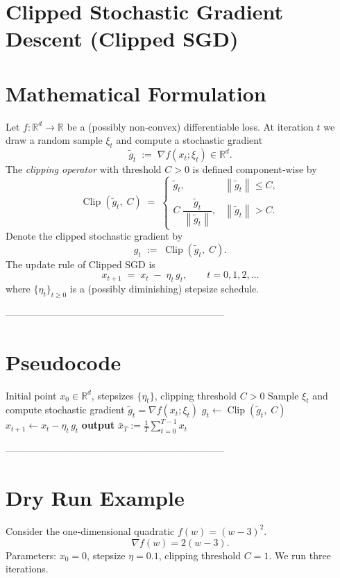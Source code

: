 \documentclass{article}
\newcommand{\clip}[2]{\operatorname{Clip}\!\left(#1,\;#2\right)}
\newcommand{\norm}[1]{\left\|#1\right\|}
\newcommand{\R}{\mathbb{R}}
\begin{document}
\section*{Clipped Stochastic Gradient Descent (Clipped SGD)}

\section*{Mathematical Formulation}
Let $f:\R^{d}\rightarrow\R$ be a (possibly non‑convex) differentiable loss.  
At iteration $t$ we draw a random sample $\xi_t$ and compute a stochastic gradient
\[
\tilde g_t \;:=\; \nabla f(x_t;\xi_t)\in\R^{d}.
\]
The \emph{clipping operator} with threshold $C>0$ is defined component‑wise by
\[
\clip{\tilde g_t}{C}\;=\;
\begin{cases}
\tilde g_t, & \norm{\tilde g_t}\le C,\\[4pt]
C\;\dfrac{\tilde g_t}{\norm{\tilde g_t}}, & \norm{\tilde g_t}> C .
\end{cases}
\tag{1}
\]
Denote the clipped stochastic gradient by
\[
g_t \;:=\; \clip{\tilde g_t}{C}.
\]
The update rule of Clipped SGD is
\[
x_{t+1}\;=\;x_t\;-\;\eta_t\, g_t ,\qquad t=0,1,2,\dots
\tag{2}
\]
where $\{\eta_t\}_{t\ge0}$ is a (possibly diminishing) stepsize schedule.

--------------------------------------------------------------------
\section*{Pseudocode}
\begin{algorithm}[H]
\caption{Clipped Stochastic Gradient Descent}
\begin{algorithmic}[1]
\Require Initial point $x_0\in\R^{d}$, stepsizes $\{\eta_t\}$, clipping threshold $C>0$
    \State Sample $\xi_t$ and compute stochastic gradient $\tilde g_t=\nabla f(x_t;\xi_t)$
    \State $g_t\gets\clip{\tilde g_t}{C}$ 
    \State $x_{t+1}\gets x_t-\eta_t\, g_t$ 
\EndFor
\State \textbf{output} $ \displaystyle \bar x_T:=\frac1T\sum_{t=0}^{T-1}x_t $
\end{algorithmic}
\end{algorithm}

--------------------------------------------------------------------
\section*{Dry Run Example}
Consider the one‑dimensional quadratic $f(w)=(w-3)^2$.
\[
\nabla f(w)=2(w-3).
\]
Parameters: $x_0=0$, stepsize $\eta=0.1$, clipping threshold $C=1$.
We run three iterations.
\end{document}
